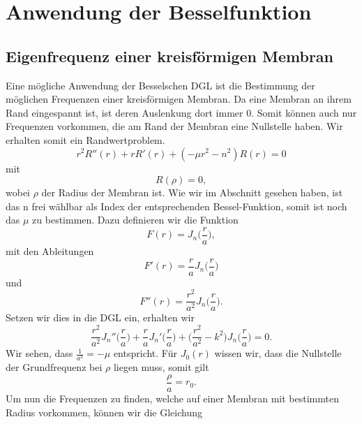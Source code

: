 \section{Anwendung der Besselfunktion}
\subsection[Eigenfrequenz einer kreisförmigen Membram]{Eigenfrequenz einer kreisförmigen Membran}

Eine mögliche Anwendung der Besselschen DGL ist die Bestimmung der möglichen Frequenzen einer kreisförmigen Membran. 
Da eine Membran an ihrem Rand eingespannt ist, ist deren Auslenkung dort immer 0. Somit können auch nur Frequenzen vorkommen, die am Rand der Membran eine Nullstelle haben. Wir erhalten somit ein Randwertproblem.
\begin{equation}
r^2 R''(r) + r R'(r) + (-\mu r^2 - n^2)R(r) = 0
\label{eq:dglmitmu}
\end{equation}
mit 
\begin{equation}
R(\rho) = 0,
\end{equation}
wobei $\rho$ der Radius der Membran ist.
Wie wir im Abschnitt  gesehen haben, ist das n frei wählbar als Index der entsprechenden Bessel-Funktion, somit ist noch das $\mu$ zu bestimmen. 
Dazu definieren wir die Funktion
\begin{equation}
F(r) = J_n \biggl(\frac{r}{a} \biggr),
\end{equation}
mit den Ableitungen
\begin{equation}
F'(r) = \frac{r}{a} J_n \biggl(\frac{r}{a} \biggr)
\end{equation}
und 
\begin{equation}
F''(r) = \frac{r^2}{a^2} J_n \biggl(\frac{r}{a} \biggr).
\end{equation}
Setzen wir dies in die DGL  ein, erhalten wir
\begin{equation}
\frac{r^2}{a^2}J_n''\biggl(\frac{r}{a} \biggr) +
\frac{r}{a}J_n'\biggl(\frac{r}{a} \biggr) +
\biggl(\frac{r^2}{a^2} - k^2\biggr)J_n\biggl(\frac{r}{a}\biggr) = 0.
\end{equation}
Wir sehen, dass $\frac{1}{a^2}=-\mu$ entspricht.
Für $J_0(r)$ wissen wir, dass die Nullstelle der Grundfrequenz bei $\rho$ liegen muss, somit gilt
\begin{equation}
\frac{\rho}{a} = r_0.
\end{equation}
Um nun die Frequenzen zu finden, welche auf einer Membran mit bestimmten Radius vorkommen, können wir die Gleichung
